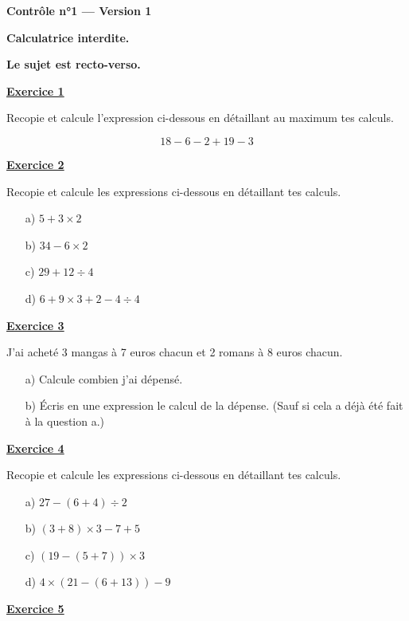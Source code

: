 \documentclass[13pt]{extarticle}
\newcommand{\exo}[1]{%
  \vspace{0.8em}%
  \noindent\large\underline{\textbf{Exercice #1}}%
  \vspace{0.2em}\par%
}
\newcommand{\entetecontrole}[1]{%
\begin{center}
\textbf{\huge{Contrôle n°1 --- Version #1}}
\end{center}

\begin{center}
\textbf{Calculatrice interdite.}\par
\textbf{Le sujet est recto-verso.}

\end{center}
}
\begin{document}
\entetecontrole{1}
\exo{1}

\noindent Recopie et calcule l'expression ci-dessous en détaillant au maximum tes calculs.

\[
18 - 6 - 2 + 19 - 3
\]

\exo{2}

\noindent Recopie et calcule les expressions ci-dessous en détaillant tes calculs.

\begin{itemize}
  \item[a)] $5 + 3 \times 2$
  \item[b)] $34 - 6 \times 2$
  \item[c)] $29 + 12 \div 4$
  \item[d)] $6 + 9 \times 3 + 2 - 4 \div 4$
\end{itemize}

\exo{3}

\noindent J'ai acheté 3 mangas à 7 euros chacun et 2 romans à 8 euros chacun.

\begin{itemize}
  \item[a)] Calcule combien j'ai dépensé.
  \item[b)] Écris en une expression le calcul de la dépense. (Sauf si cela a déjà été fait à la question a.)
\end{itemize}

\exo{4}

\noindent Recopie et calcule les expressions ci-dessous en détaillant tes calculs.

\begin{itemize}
  \item[a)] $27 - (6 + 4) \div 2$
  \item[b)] $(3 + 8) \times 3 - 7 + 5$
  \item[c)] $(19 - (5 + 7)) \times 3$
  \item[d)] $4 \times (21 - (6 + 13)) - 9$
\end{itemize}

\newpage

\exo{5}
\end{document}

